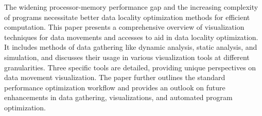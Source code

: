 \noindent The widening processor-memory performance gap and the increasing complexity of programs necessitate better data locality optimization methods for efficient computation. This paper presents a comprehensive overview of visualization techniques for data movements and accesses to aid in data locality optimization. It includes methods of data gathering like dynamic analysis, static analysis, and simulation, and discusses their usage in various visualization tools at different granularities. Three specific tools are detailed, providing unique perspectives on data movement visualization. The paper further outlines the standard performance optimization workflow and provides an outlook on future enhancements in data gathering, visualizations, and automated program optimization.